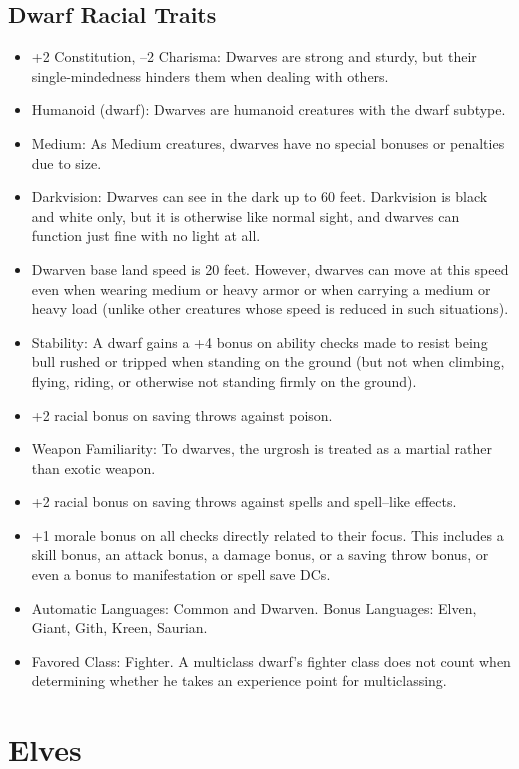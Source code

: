 \documentclass[10pt,a4paper,twocolumn]{d20}
\begin{document}
\subsection{Dwarf Racial Traits}
\begin{itemize}
    \item +2 Constitution, –2 Charisma: Dwarves are strong and sturdy, but their single‐mindedness hinders them when dealing with others.
    \item Humanoid (dwarf): Dwarves are humanoid creatures with the dwarf subtype.
    \item Medium: As Medium creatures, dwarves have no special bonuses or penalties due to size.
    \item Darkvision: Dwarves can see in the dark up to 60 feet. Darkvision is black and white only, but it is otherwise like normal sight, and dwarves can function just fine with no light at all.
    \item Dwarven base land speed is 20 feet. However, dwarves can move at this speed even when wearing medium or heavy armor or when carrying a medium or heavy load (unlike other creatures whose speed is reduced in such situations).
    \item Stability: A dwarf gains a +4 bonus on ability checks made to resist being bull rushed or tripped when standing on the ground (but not when climbing, flying, riding, or otherwise not standing firmly on the ground).
    \item +2 racial bonus on saving throws against poison.
    \item Weapon Familiarity: To dwarves, the urgrosh is treated as a martial rather than exotic weapon.
    \item +2 racial bonus on saving throws against spells and spell–like effects.
    \item +1 morale bonus on all checks directly related to their focus. This includes a skill bonus, an attack bonus, a damage bonus, or a saving throw bonus, or even a bonus to manifestation or spell save DCs.
    \item Automatic Languages: Common and Dwarven. Bonus Languages: Elven, Giant, Gith, Kreen, Saurian.
    \item Favored Class: Fighter. A multiclass dwarf’s fighter class does not count when determining whether he takes an experience point for multiclassing.
\end{itemize}

\section{Elves}
\end{document}
